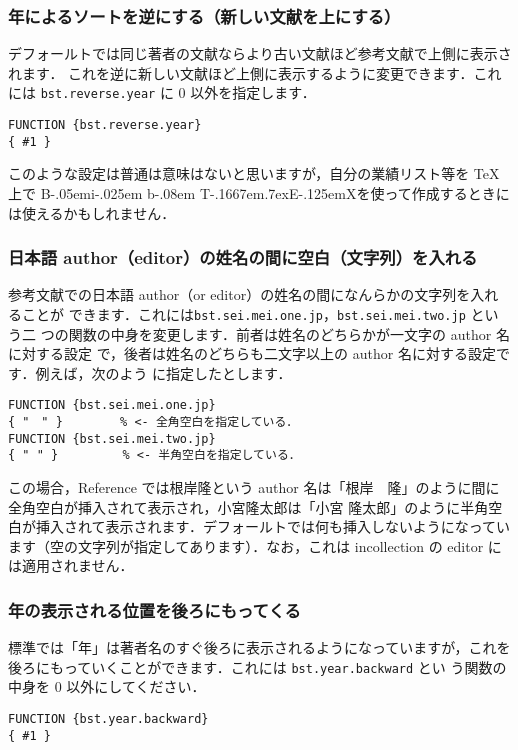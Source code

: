 \documentclass[a4j,10pt]{jarticle}
\def\BibTeX{{\rm B\kern-.05em{\sc i\kern-.025em b}\kern-.08em
    T\kern-.1667em\lower.7ex\hbox{E}\kern-.125emX}}
\begin{document}
\subsubsection{年によるソートを逆にする（新しい文献を上にする）}

デフォールトでは同じ著者の文献ならより古い文献ほど参考文献で上側に表示されます．
これを逆に新しい文献ほど上側に表示するように変更できます．これには
\texttt{bst.reverse.year} に 0 以外を指定します．
\begin{screen}
\begin{verbatim}
FUNCTION {bst.reverse.year}
{ #1 }
\end{verbatim}
\end{screen}

このような設定は普通は意味はないと思いますが，自分の業績リスト等を \TeX 
上で \BibTeX を使って作成するときには使えるかもしれません．

\subsubsection{日本語 author（editor）の姓名の間に空白（文字列）を入れる}

参考文献での日本語 author（or editor）の姓名の間になんらかの文字列を入れることが
できます．これには\verb|bst.sei.mei.one.jp|，\verb|bst.sei.mei.two.jp| という二
つの関数の中身を変更します．前者は姓名のどちらかが一文字の author 名に対する設定
で，後者は姓名のどちらも二文字以上の author 名に対する設定です．例えば，次のよう
に指定したとします．
\begin{screen}
\begin{verbatim}
FUNCTION {bst.sei.mei.one.jp}
{ "　" }        % <- 全角空白を指定している．
FUNCTION {bst.sei.mei.two.jp}
{ " " }         % <- 半角空白を指定している．
\end{verbatim}
\end{screen}

この場合，Reference では根岸隆という author 名は「根岸　隆」のように間に
全角空白が挿入されて表示され，小宮隆太郎は「小宮 隆太郎」のように半角空
白が挿入されて表示されます．デフォールトでは何も挿入しないようになってい
ます（空の文字列が指定してあります）．なお，これは incollection の editor 
には適用されません．

\subsubsection{年の表示される位置を後ろにもってくる}

標準では「年」は著者名のすぐ後ろに表示されるようになっていますが，これを
後ろにもっていくことができます．これには \texttt{bst.year.backward} とい
う関数の中身を 0 以外にしてください．
\begin{screen}
\begin{verbatim}
FUNCTION {bst.year.backward}
{ #1 }
\end{verbatim}
\end{screen}
\end{document}
